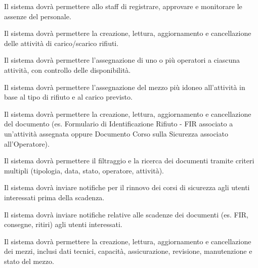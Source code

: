 \documentclass[a4paper]{report}
\begin{document}


Il sistema dovrà permettere allo staff di registrare, approvare e monitorare le assenze del personale.



Il sistema dovrà permettere la creazione, lettura, aggiornamento e cancellazione delle attività di carico/scarico rifiuti.


Il sistema dovrà permettere l'assegnazione di uno o più operatori a ciascuna attività, con controllo delle disponibilità.


Il sistema dovrà permettere l'assegnazione del mezzo più idoneo all'attività in base al tipo di rifiuto e al carico previsto.



Il sistema dovrà permettere la creazione, lettura, aggiornamento e cancellazione del documento (es. Formulario di Identificazione Rifiuto - FIR associato a un'attività assegnata oppure Documento Corso sulla Sicurezza associato all'Operatore).


Il sistema dovrà permettere il filtraggio e la ricerca dei documenti tramite criteri multipli (tipologia, data, stato, operatore, attività).


Il sistema dovrà inviare notifiche per il rinnovo dei corsi di sicurezza agli utenti interessati prima della scadenza.


Il sistema dovrà inviare notifiche relative alle scadenze dei documenti (es. FIR, consegne, ritiri) agli utenti interessati.



Il sistema dovrà permettere la creazione, lettura, aggiornamento e cancellazione dei mezzi, inclusi dati tecnici, capacità, assicurazione, revisione, manutenzione e stato del mezzo.
\end{document}
